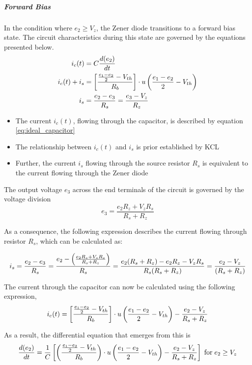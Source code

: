 \subparagraph{Forward Bias}
In the condition where $e_2 \geq V_z$, the Zener diode transitions to a forward bias state. The circuit characteristics during this state are governed by the equations presented below.
\begin{align}
    i_c(t) &= C\frac{d(e_2)}{dt}\\
    i_c(t) + i_s &= \left[\frac{\frac{e_1 - e_2}{2} - V_{th}}{R_b} \right]\cdot u\left(\frac{e_1 - e_2}{2} - V_{th} \right)\\
    i_s &= \frac{e_2-e_3}{R_s}=\frac{e_3-V_z}{R_z}
\end{align}
\begin{itemize}
	\item The current $i_c(t)$, flowing through the capacitor, is described by equation \ref{eq:ideal_capacitor}
	\item The relationship between $i_c(t)$ and $i_s$ is prior established by KCL
	\item Further, the current $i_s$ flowing through the source resistor $R_s$ is equivalent to the current flowing through the Zener diode
\end{itemize}

The output voltage $e_3$ across the end terminals of the circuit is governed by the voltage division
\begin{equation}
    e_3=\frac{e_2R_z+V_zR_s}{R_s+R_z}
\end{equation}

As a consequence, the following expression describes the current flowing through resistor $R_s$, which can be calculated as:

\begin{equation}
    i_s=\frac{e_2-e_3}{R_s}=\frac{e_2-\left(\frac{e_2R_z+V_zR_s}{R_s+R_z} \right)}{R_s}=\frac{e_2(R_s+R_z)-e_2R_z-V_zR_s}{R_s(R_s+R_z)}=\frac{e_2-V_z}{(R_s+R_z)}
\end{equation}

The current through the capacitor can now be calculated using the following expression,
\begin{equation}
    i_c(t) = \left[\frac{\frac{e_1 - e_2}{2} - V_{th}}{R_b} \right]\cdot u\left(\frac{e_1 - e_2}{2} - V_{th} \right)-\frac{e_2-V_z}{R_s+R_z}
\end{equation}

As a result, the differential equation that emerges from this is
\begin{equation}
    \frac{d(e_2)}{dt}=\frac{1}{C}\left[\left(\frac{\frac{e_1 - e_2}{2} - V_{th}}{R_b} \right)\cdot u\left(\frac{e_1 - e_2}{2} - V_{th} \right)-\frac{e_2-V_z}{R_s+R_z} \right] \hspace{0.1cm} \text{for} \hspace{0.1cm} e_2 \geq V_z
\end{equation}

